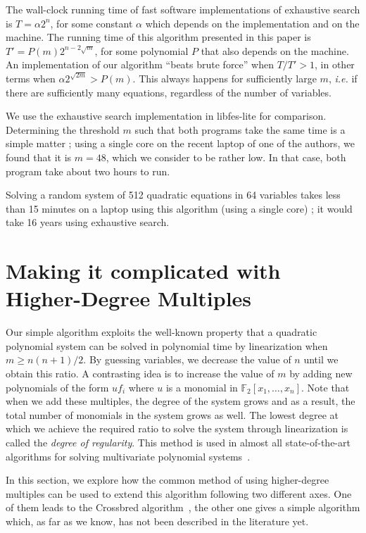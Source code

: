 \documentclass[a4paper,UKenglish,cleveref, autoref]{lipics-v2019}
\begin{document}
The wall-clock running time of fast software implementations of exhaustive
search is $T = \alpha 2^n$, for some constant $\alpha$ which depends on the
implementation and on the machine. The running time of this algorithm presented
in this paper is $T' = P(m) 2^{n - 2\sqrt{m}}$, for some polynomial $P$ that
also depends on the machine. An implementation of our algorithm ``beats brute
force'' when $T/T' > 1$, in other terms when
$\alpha 2^{\sqrt{2m}} > P(m)$. This always happens for sufficiently large
$m$, \textit{i.e.} if there are sufficiently many equations, regardless of the
number of variables.

We use the exhaustive search implementation in \textsf{libfes-lite} for
comparison. Determining the threshold $m$ such that both programs take the same
time is a simple matter ; using a single core on the recent laptop of one of the
authors, we found that it is $m=48$, which we consider to be rather low. In that
case, both program take about two hours to run.

Solving a random system of 512 quadratic equations in 64 variables takes less
than 15 minutes on a laptop using this algorithm (using a single core) ; it
would take 16 years using exhaustive search.


\section{Making it complicated with Higher-Degree Multiples}
\label{sec:extensions}


Our simple algorithm exploits the well-known property that a quadratic polynomial system can be solved in polynomial time by linearization when $m \geq n(n+1)/2$.
By guessing variables, we decrease the value of $n$ until we obtain this ratio. A contrasting idea is to increase the value of $m$ by adding new polynomials of the form $uf_i$ where $u$ is a monomial in $\mathbb{F}_2[x_1, \dots, x_n]$.
Note that when we add these multiples, the degree of the system grows and as a result, the total number of monomials in the system grows as well. The lowest degree at which we achieve the required ratio to solve the system through linearization is called the \textit{degree of regularity}. This method is used in almost all state-of-the-art algorithms for solving multivariate polynomial systems~\cite{F4,F5,CourtoisKPS00,BardetFSS13,JouxV17}. 

In this section, we explore how the common method of using higher-degree multiples can be used to extend this algorithm following two different axes.
%
One of them leads to the \textsf{Crossbred} algorithm~\cite{JouxV17}, the other
one gives a simple algorithm which, as far as we know, has not been described
in the literature yet.
\end{document}
